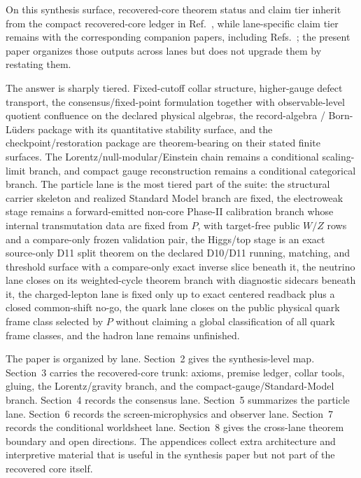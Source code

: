 \documentclass[11pt]{article}
\begin{document}
On this synthesis surface, recovered-core theorem status and claim tier inherit from the compact recovered-core ledger in Ref.~\cite{ophcompact}, while lane-specific claim tier remains with the corresponding companion papers, including Refs.~\cite{ophparticles,ophconsensus,ophmicrophysics}; the present paper organizes those outputs across lanes but does not upgrade them by restating them.

The answer is sharply tiered. Fixed-cutoff collar structure, higher-gauge defect transport,
the consensus/fixed-point formulation together with observable-level quotient confluence on the
declared physical algebras, the
record-algebra / Born-L\"uders package with its quantitative stability surface, and the
checkpoint/restoration package are theorem-bearing on their stated finite
surfaces. The Lorentz/null-modular/Einstein chain remains a conditional scaling-limit branch,
and compact gauge reconstruction remains a conditional categorical branch. The particle lane is the most tiered part of
the suite: the structural carrier skeleton and realized Standard Model branch are fixed, the
electroweak stage remains a forward-emitted non-core Phase-II calibration branch whose internal
transmutation data are fixed from \(P\), with target-free public \(W/Z\) rows and a compare-only
frozen validation pair, the Higgs/top stage is an exact source-only D11 split theorem on the declared D10/D11 running, matching, and threshold surface with a compare-only exact inverse slice beneath it, the neutrino lane
closes on its weighted-cycle theorem branch with diagnostic sidecars beneath it, the charged-lepton lane is fixed
only up to exact centered readback plus a closed common-shift no-go, the quark lane closes on the
public physical quark frame class selected by \(P\) without claiming a global classification of all
quark frame classes, and the hadron lane remains unfinished.

The paper is organized by lane. Section~2 gives the synthesis-level map. Section~3 carries the
recovered-core trunk: axioms, premise ledger, collar tools, gluing, the Lorentz/gravity branch,
and the compact-gauge/Standard-Model branch. Section~4 records the consensus lane. Section~5
summarizes the particle lane. Section~6 records the screen-microphysics and observer lane.
Section~7 records the conditional worldsheet lane. Section~8 gives the cross-lane theorem
boundary and open directions. The appendices collect extra architecture and interpretive
material that is useful in the synthesis paper but not part of the recovered core itself.
\end{document}
